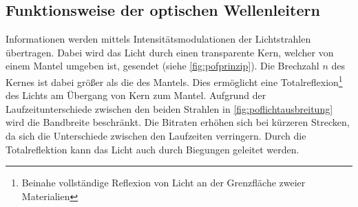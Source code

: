 \subsection{Funktionsweise der optischen Wellenleitern}
\label{subsec:poffunktionsweise}

Informationen werden mittels Intensitätsmodulationen der Lichtstrahlen
übertragen. Dabei wird das Licht durch einen transparente Kern, welcher von
einem Mantel umgeben ist, gesendet (siehe \autoref{fig:pofprinzip}). Die
Brechzahl $n$ des Kernes ist dabei größer als die des Mantels. Dies ermöglicht
eine Totalreflexion\footnote{Beinahe vollständige Reflexion von Licht an der
Grenzfläche zweier Materialien} des Lichts am Übergang von Kern zum Mantel.
Aufgrund der Laufzeitunterschiede zwischen den beiden Strahlen in
\autoref{fig:poflichtausbreitung} wird die Bandbreite beschränkt. Die Bitraten
erhöhen sich bei kürzeren Strecken, da sich die Unterschiede zwischen den
Laufzeiten verringern. Durch die Totalreflektion kann das Licht auch durch
Biegungen geleitet werden.

